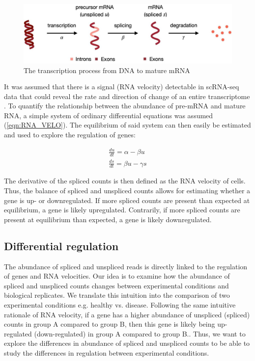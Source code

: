 \begin{figure}[!htb]
\begin{center}
\includegraphics{figure/regulation.jpg}
\end{center}
\caption{The transcription process from DNA to mature mRNA \citep{rna_velo_traj}}
\label{fig:RNA_VELO}
\end{figure}
\FloatBarrier

It was assumed that there is a signal (RNA velocity) detectable in scRNA-seq data that could reveal the rate and direction of change of an entire transcriptome \citep{rna_velo}. To quantify the relationship between the abundance of pre-mRNA and mature RNA, a simple system of ordinary differential equations was assumed (\ref{eqn:RNA_VELO}). The equilibrium of said system can then easily be estimated and used to explore the regulation of genes:

\begin{equation}
\begin{array}{l}
\frac{du}{dt} = \alpha - \beta u \\
\frac{ds}{dt} = \beta u - \gamma s
\end{array}
\label{eqn:RNA_VELO}
\end{equation}

The derivative of the spliced counts is then defined as the RNA velocity of cells. Thus, the balance of spliced and unspliced counts allows for estimating whether a gene is up- or downregulated. If more spliced counts are present than expected at equilibrium, a gene is likely upregulated. Contrarily, if more spliced counts are present at equilibrium than expected, a gene is likely downregulated.

\subsection{Differential regulation}
The abundance of spliced and unspliced reads is directly linked to the regulation of genes and RNA velocities. Our idea is to examine how the abundance of spliced and unspliced counts changes between experimental conditions and biological replicates. We translate this intuition into the comparison of two experimental conditions e.g. healthy vs. disease. Following the same intuitive rationale of RNA velocity, if a gene has a higher abundance of unspliced (spliced) counts in group A  compared to group B, then this gene is likely being up-regulated (down-regulated) in group A compared to group B.. Thus, we want to explore the differences in abundance of spliced and unspliced counts to be able to study the differences in regulation between experimental conditions.

